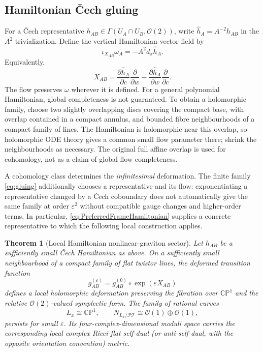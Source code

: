 \documentclass[aps,prd,reprint,nofootinbib,superscriptaddress]{revtex4-2}
\newtheorem{theorem}{Theorem}[section]
\theoremstyle{definition}
\theoremstyle{remark}
\newcommand{\CP}{\mathbb{CP}}
\newcommand{\cO}{\mathcal{O}}
\newcommand{\PT}{\mathcal{PT}}
\newcommand{\eps}{\varepsilon}
\begin{document}
\subsection{Hamiltonian \v{C}ech gluing}

For a \v{C}ech representative $h_{AB}\in\Gamma(U_A\cap U_B,\cO(2))$, write $\widehat h_A=A^{-2}h_{AB}$ in the $A^2$ trivialization. Define the vertical Hamiltonian vector field by
\begin{equation}
\iota_{X_{AB}}\omega_A=-A^2d_\pi\widehat h_A.
\label{eq:HamiltonianDef}
\end{equation}
Equivalently,
\begin{equation}
X_{AB}
=\frac{\partial\widehat h_A}{\partial c}\frac{\partial}{\partial w}
-\frac{\partial\widehat h_A}{\partial w}\frac{\partial}{\partial c}.
\label{eq:Xhlocal}
\end{equation}
The flow preserves $\omega$ wherever it is defined. For a general polynomial Hamiltonian, global completeness is not guaranteed. To obtain a holomorphic family, choose two slightly overlapping discs covering the compact base, with overlap contained in a compact annulus, and bounded fibre neighbourhoods of a compact family of lines. The Hamiltonian is holomorphic near this overlap, so holomorphic ODE theory gives a common small flow parameter there; shrink the neighbourhoods as necessary. The original full affine overlap is used for cohomology, not as a claim of global flow completeness.

A cohomology class determines the \emph{infinitesimal} deformation. The finite family \eqref{eq:gluing} additionally chooses a representative and its flow: exponentiating a representative changed by a \v{C}ech coboundary does not automatically give the same family at order $\eps^2$ without compatible gauge changes and higher-order terms. In particular, \eqref{eq:PreferredFrameHamiltonian} supplies a concrete representative to which the following local construction applies.

\begin{theorem}[Local Hamiltonian nonlinear-graviton sector]
\label{thm:twistor}
Let $h_{AB}$ be a sufficiently small \v{C}ech Hamiltonian as above. On a sufficiently small neighbourhood of a compact family of flat twistor lines, the deformed transition function
\begin{equation}
g_{AB}^{(\eps)}
=g_{AB}^{(0)}\circ\exp(\eps X_{AB})
\label{eq:gluing}
\end{equation}
defines a local holomorphic deformation preserving the fibration over $\CP^1$ and the relative $\cO(2)$-valued symplectic form. The family of rational curves
\[
L_x\cong\CP^1,
\qquad
N_{L_x/\PT}\cong\cO(1)\oplus\cO(1),
\]
persists for small $\eps$. Its four-complex-dimensional moduli space carries the corresponding local complex Ricci-flat self-dual (or anti-self-dual, with the opposite orientation convention) metric.
\end{theorem}
\end{document}
